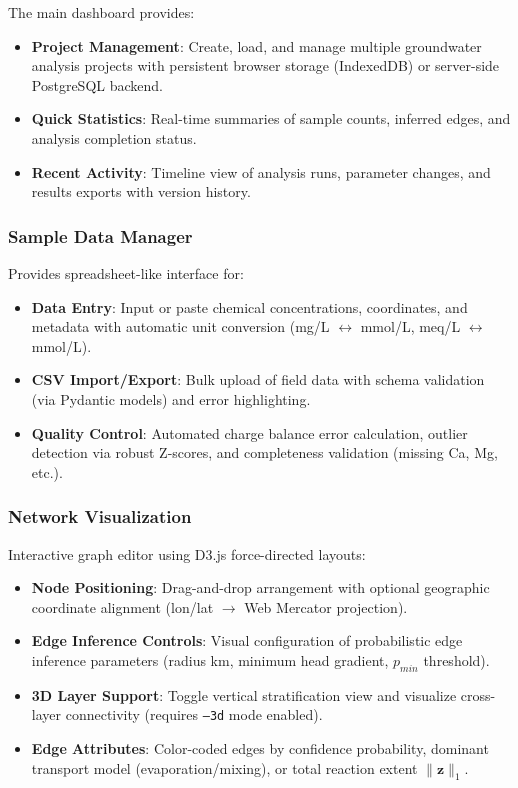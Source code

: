 The main dashboard provides:
\begin{itemize}
	\item \textbf{Project Management}: Create, load, and manage multiple groundwater analysis projects with persistent browser storage (IndexedDB) or server-side PostgreSQL backend.
	\item \textbf{Quick Statistics}: Real-time summaries of sample counts, inferred edges, and analysis completion status.
	\item \textbf{Recent Activity}: Timeline view of analysis runs, parameter changes, and results exports with version history.
\end{itemize}

\subsubsection{Sample Data Manager}

Provides spreadsheet-like interface for:
\begin{itemize}
	\item \textbf{Data Entry}: Input or paste chemical concentrations, coordinates, and metadata with automatic unit conversion (mg/L $\leftrightarrow$ mmol/L, meq/L $\leftrightarrow$ mmol/L).
	\item \textbf{CSV Import/Export}: Bulk upload of field data with schema validation (via Pydantic models) and error highlighting.
	\item \textbf{Quality Control}: Automated charge balance error calculation, outlier detection via robust Z-scores, and completeness validation (missing Ca, Mg, etc.).
\end{itemize}

\subsubsection{Network Visualization}

Interactive graph editor using D3.js force-directed layouts:
\begin{itemize}
	\item \textbf{Node Positioning}: Drag-and-drop arrangement with optional geographic coordinate alignment (lon/lat $\to$ Web Mercator projection).
	\item \textbf{Edge Inference Controls}: Visual configuration of probabilistic edge inference parameters (radius km, minimum head gradient, $p_{min}$ threshold).
	\item \textbf{3D Layer Support}: Toggle vertical stratification view and visualize cross-layer connectivity (requires \texttt{--3d} mode enabled).
	\item \textbf{Edge Attributes}: Color-coded edges by confidence probability, dominant transport model (evaporation/mixing), or total reaction extent $\|\mathbf{z}\|_1$.
\end{itemize}

